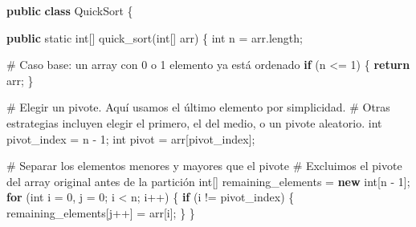 \documentclass[
  spanish,
  letterpaper,
  DIV=11,
  numbers=noendperiod]{scrreprt}
\newenvironment{Shaded}{\begin{snugshade}}{\end{snugshade}}
\newcommand{\ControlFlowTok}[1]{\textcolor[rgb]{0.00,0.23,0.31}{\textbf{#1}}}
\newcommand{\DataTypeTok}[1]{\textcolor[rgb]{0.68,0.00,0.00}{#1}}
\newcommand{\DecValTok}[1]{\textcolor[rgb]{0.68,0.00,0.00}{#1}}
\newcommand{\FunctionTok}[1]{\textcolor[rgb]{0.28,0.35,0.67}{#1}}
\newcommand{\KeywordTok}[1]{\textcolor[rgb]{0.00,0.23,0.31}{\textbf{#1}}}
\newcommand{\NormalTok}[1]{\textcolor[rgb]{0.00,0.23,0.31}{#1}}
\newcommand{\OperatorTok}[1]{\textcolor[rgb]{0.37,0.37,0.37}{#1}}
\begin{document}
\begin{Shaded}
\begin{Highlighting}[]
\KeywordTok{public} \KeywordTok{class}\NormalTok{ QuickSort }\OperatorTok{\{}
    
    \KeywordTok{public} \DataTypeTok{static} \DataTypeTok{int}\OperatorTok{[]} \FunctionTok{quick\_sort}\OperatorTok{(}\DataTypeTok{int}\OperatorTok{[]}\NormalTok{ arr}\OperatorTok{)} \OperatorTok{\{}
        \DataTypeTok{int}\NormalTok{ n }\OperatorTok{=}\NormalTok{ arr}\OperatorTok{.}\FunctionTok{length}\OperatorTok{;}
        
\NormalTok{        \# Caso base}\OperatorTok{:}\NormalTok{ un array con }\DecValTok{0}\NormalTok{ o }\DecValTok{1}\NormalTok{ elemento ya está ordenado}
        \ControlFlowTok{if} \OperatorTok{(}\NormalTok{n }\OperatorTok{\textless{}=} \DecValTok{1}\OperatorTok{)} \OperatorTok{\{}
            \ControlFlowTok{return}\NormalTok{ arr}\OperatorTok{;}
        \OperatorTok{\}}
        
\NormalTok{        \# Elegir un pivote}\OperatorTok{.} \FunctionTok{Aqu}\NormalTok{í usamos el último elemento por simplicidad}\OperatorTok{.}
\NormalTok{        \# Otras estrategias incluyen elegir el primero}\OperatorTok{,}\NormalTok{ el del medio}\OperatorTok{,}\NormalTok{ o un pivote aleatorio}\OperatorTok{.}
        \FunctionTok{int}\NormalTok{ pivot\_index }\OperatorTok{=}\NormalTok{ n }\OperatorTok{{-}} \DecValTok{1}\OperatorTok{;}
        \DataTypeTok{int}\NormalTok{ pivot }\OperatorTok{=}\NormalTok{ arr}\OperatorTok{[}\NormalTok{pivot\_index}\OperatorTok{];}
        
\NormalTok{        \# Separar los elementos menores y mayores que el pivote}
\NormalTok{        \# Excluimos el pivote del array original antes de la partición}
        \DataTypeTok{int}\OperatorTok{[]}\NormalTok{ remaining\_elements }\OperatorTok{=} \KeywordTok{new} \DataTypeTok{int}\OperatorTok{[}\NormalTok{n }\OperatorTok{{-}} \DecValTok{1}\OperatorTok{];}
        \ControlFlowTok{for} \OperatorTok{(}\DataTypeTok{int}\NormalTok{ i }\OperatorTok{=} \DecValTok{0}\OperatorTok{,}\NormalTok{ j }\OperatorTok{=} \DecValTok{0}\OperatorTok{;}\NormalTok{ i }\OperatorTok{\textless{}}\NormalTok{ n}\OperatorTok{;}\NormalTok{ i}\OperatorTok{++)} \OperatorTok{\{}
            \ControlFlowTok{if} \OperatorTok{(}\NormalTok{i }\OperatorTok{!=}\NormalTok{ pivot\_index}\OperatorTok{)} \OperatorTok{\{}
\NormalTok{                remaining\_elements}\OperatorTok{[}\NormalTok{j}\OperatorTok{++]} \OperatorTok{=}\NormalTok{ arr}\OperatorTok{[}\NormalTok{i}\OperatorTok{];}
            \OperatorTok{\}}
        \OperatorTok{\}}
        

\end{Highlighting}
\end{Shaded}
\end{document}
